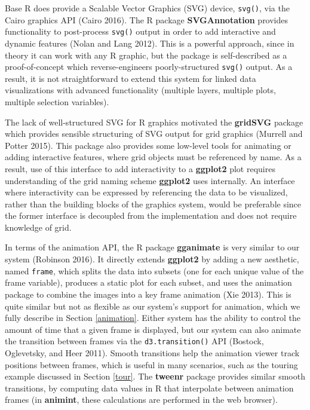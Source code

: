 \documentclass[12pt,]{article}
\theoremstyle{definition}
\theoremstyle{definition}
\theoremstyle{definition}
\theoremstyle{remark}
\begin{document}
Base R does provide a Scalable Vector Graphics (SVG) device,
\texttt{svg()}, via the Cairo graphics API (Cairo 2016). The R package
\textbf{SVGAnnotation} provides functionality to post-process
\texttt{svg()} output in order to add interactive and dynamic features
(Nolan and Lang 2012). This is a powerful approach, since in theory it
can work with any R graphic, but the package is self-described as a
proof-of-concept which reverse-engineers poorly-structured
\texttt{svg()} output. As a result, it is not straightforward to extend
this system for linked data visualizations with advanced functionality
(multiple layers, multiple plots, multiple selection variables).

The lack of well-structured SVG for R graphics motivated the
\textbf{gridSVG} package which provides sensible structuring of SVG
output for grid graphics (Murrell and Potter 2015). This package also
provides some low-level tools for animating or adding interactive
features, where grid objects must be referenced by name. As a result,
use of this interface to add interactivity to a \textbf{ggplot2} plot
requires understanding of the grid naming scheme \textbf{ggplot2} uses
internally. An interface where interactivity can be expressed by
referencing the data to be visualized, rather than the building blocks
of the graphics system, would be preferable since the former interface
is decoupled from the implementation and does not require knowledge of
grid.

In terms of the animation API, the R package \textbf{gganimate} is very
similar to our system (Robinson 2016). It directly extends
\textbf{ggplot2} by adding a new aesthetic, named \texttt{frame}, which
splits the data into subsets (one for each unique value of the frame
variable), produces a static plot for each subset, and uses the
animation package to combine the images into a key frame animation (Xie
2013). This is quite similar but not as flexible as our system's support
for animation, which we fully describe in Section \ref{animation}.
Either system has the ability to control the amount of time that a given
frame is displayed, but our system can also animate the transition
between frames via the \texttt{d3.transition()} API (Bostock,
Oglevetsky, and Heer 2011). Smooth transitions help the animation viewer
track positions between frames, which is useful in many scenarios, such
as the touring example discussed in Section \ref{tour}. The
\textbf{tweenr} package provides similar smooth transitions, by
computing data values in R that interpolate between animation frames (in
\textbf{animint}, these calculations are performed in the web browser).
\end{document}
